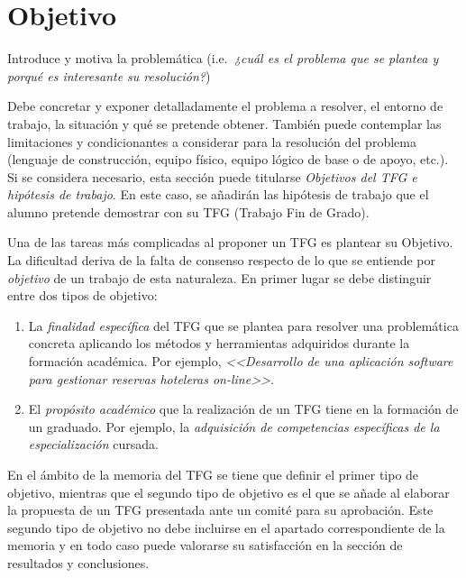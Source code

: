 \chapter{Objetivo}
\label{cap:Objetivo}

Introduce y motiva la problemática (i.e.\emph{\ ¿cuál es el problema que se plantea y porqué es interesante su resolución?})

Debe concretar y exponer detalladamente el problema a resolver, el entorno de 
trabajo, la situación y qué se pretende obtener. También puede contemplar las 
limitaciones y condicionantes a considerar para la resolución del problema 
(lenguaje de construcción, equipo físico, equipo lógico de base o de apoyo, 
etc.). Si se considera necesario, esta sección puede titularse 
\emph{Objetivos del TFG e hipótesis de trabajo}. En este caso, se añadirán 
las hipótesis de trabajo que el alumno pretende demostrar con su TFG (Trabajo 
Fin de Grado).

Una de las tareas más complicadas al proponer un TFG es plantear su \textsf{Objetivo}. La dificultad deriva de la falta de consenso respecto de lo que se entiende por \emph{objetivo} de un trabajo de esta naturaleza. En primer lugar se debe distinguir entre dos tipos de objetivo:

\begin{enumerate}
	\item La \emph{finalidad específica} del TFG que se plantea para resolver una problemática concreta aplicando los métodos y herramientas adquiridos durante la formación académica. Por ejemplo, \emph{<<Desarrollo de una aplicación software para gestionar reservas hoteleras \emph{on-line}>>}.
	
	\item El \emph{propósito académico} que la realización de un TFG tiene en la formación de un graduado. Por ejemplo, la \emph{adquisición de competencias específicas de la especialización} cursada.
\end{enumerate}

En el ámbito de la memoria del TFG se tiene que definir el primer tipo de objetivo, mientras que el segundo tipo de objetivo es el que se añade al elaborar la propuesta de un TFG presentada ante un comité para su aprobación. Este segundo tipo de objetivo no debe incluirse en el apartado correspondiente de la memoria y en todo caso puede valorarse su satisfacción en la sección de resultados y conclusiones.

